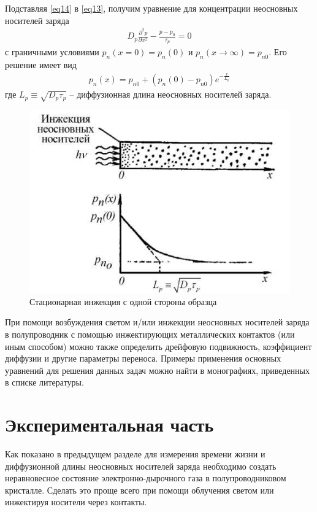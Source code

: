 \documentclass[a4paper,12pt]{article}
\begin{document}
Подставляя \eqref{eq14} в \eqref{eq13}, получим уравнение для концентрации
неосновных носителей заряда
\begin{gather}
	\label{eq15}
	D_{p} \frac{\partial^{2} p}{\partial x^{2}}-\frac{p-p_{0}}{\tau_{p}}=0
\end{gather}
с граничными условиями $p_{n}(x=0)=p_{n}(0)$ и $p_{n}(x \rightarrow \infty)=p_{n 0}$. Его решение имеет вид
\begin{gather}
	\label{eq16}
	p_{n}(x)=p_{n 0}+\left(p_{n}(0)-p_{n 0}\right) e^{-\frac{x}{L_{p}}}
\end{gather}
где $L_{p} \equiv \sqrt{D_{p} \tau_{p}}$ -- диффузионная длина неосновных носителей заряда.

\begin{figure}[H]
	\centering
	\includegraphics[]{8}
	\caption{Стационарная инжекция с одной стороны образца}
	\label{fig:figure7}
\end{figure}

При помощи возбуждения светом и/или инжекции неосновных носителей заряда в полупроводник с помощью инжектирующих металлических контактов (или иным способом) можно также определить дрейфовую подвижность, коэффициент диффузии и другие параметры переноса. Примеры применения основных уравнений для решения данных задач можно найти в монографиях, приведенных в списке литературы.


\section{Экспериментальная часть}
Как показано в предыдущем разделе для измерения времени жизни и диффузионной длины неосновных носителей заряда необходимо создать неравновесное состояние электронно-дырочного газа в полупроводниковом кристалле. Сделать это проще всего при помощи облучения светом или инжектируя носители через контакты.
\end{document}

